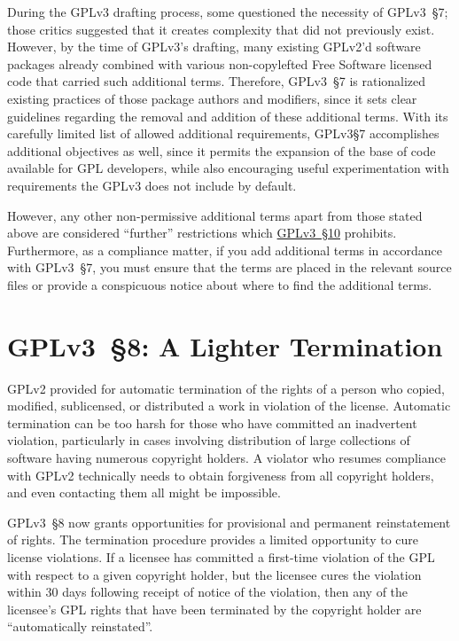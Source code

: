 During the GPLv3 drafting process, some questioned the necessity of GPLv3~\S7;
those critics suggested that it creates complexity that did not previously
exist.  However, by the time of GPLv3's drafting, many existing GPLv2'd
software packages already combined with various non-copylefted Free Software
licensed code that carried such additional terms.  Therefore, GPLv3~\S7 is
rationalized existing practices of those package authors and modifiers, since
it sets clear guidelines regarding the removal and addition of these
additional terms.  With its carefully limited list of allowed additional
requirements, GPLv3\S7 accomplishes additional objectives as well, since it
permits the expansion of the base of code available for GPL developers, while
also encouraging useful experimentation with requirements the GPLv3 does not
include by default.

However, any other non-permissive additional terms apart from those stated
above are considered ``further'' restrictions which
\hyperref[GPLv3s10]{GPLv3~\S10} prohibits.  Furthermore, as a compliance
matter, if you add additional terms in accordance with GPLv3~\S7, you must
ensure that the terms are placed in the relevant source files or provide a
conspicuous notice about where to find the additional terms.

\section{GPLv3~\S8: A Lighter Termination}

GPLv2 provided for automatic termination of the rights of a person who
copied, modified, sublicensed, or distributed a work in violation of the
license.  Automatic termination can be too harsh for those who have committed
an inadvertent violation, particularly in cases involving distribution of
large collections of software having numerous copyright holders.  A violator
who resumes compliance with GPLv2 technically needs to obtain forgiveness
from all copyright holders, and even contacting them all might be impossible.

GPLv3~\S8 now grants opportunities for provisional and permanent
reinstatement of rights. The termination procedure provides a limited
opportunity to cure license violations.  If a licensee has committed a
first-time violation of the GPL with respect to a given copyright holder, but
the licensee cures the violation within 30 days following receipt of notice
of the violation, then any of the licensee's GPL rights that have been
terminated by the copyright holder are ``automatically reinstated''.


